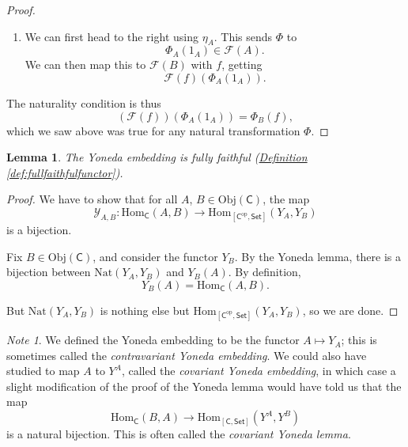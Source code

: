 \documentclass[a4paper]{report}
\newcommand{\Obj}{\mathrm{Obj}}
\newcommand{\Hom}{\mathrm{Hom}}
\newcommand{\Nat}{\mathrm{Nat}}
\theoremstyle{definition}
\theoremstyle{plain}
\newtheorem{lemma}{Lemma}[section]
\theoremstyle{remark}
\newtheorem{note}{Note}[section]
\begin{document}
\begin{proof}
\begin{enumerate}
    \item We can first head to the right using $\eta_{A}$. This sends $\Phi$ to 
      \begin{equation*}
        \Phi_{A}(1_{A}) \in \mathcal{F}(A).
      \end{equation*}
      We can then map this to $\mathcal{F}(B)$ with $f$, getting
      \begin{equation*}
        \mathcal{F}(f)(\Phi_{A}(1_{A})).
      \end{equation*}
  \end{enumerate}

  The naturality condition is thus
  \begin{equation*}
    (\mathcal{F}(f))(\Phi_{A}(1_{A})) = \Phi_{B}(f),
  \end{equation*}
  which we saw above was true for any natural transformation $\Phi$.
\end{proof}
\begin{lemma}
  The Yoneda embedding is fully faithful (\hyperref[def:fullfaithfulfunctor]{Definition \ref*{def:fullfaithfulfunctor}}).
\end{lemma}
\begin{proof}
  We have to show that for all $A$, $B \in \Obj(\mathsf{C})$, the map
  \begin{equation*}
    \mathcal{Y}_{A, B}\colon \Hom_{\mathsf{C}}(A, B) \to \Hom_{[\mathsf{C}^{\mathrm{op}}, \mathsf{Set}]}(Y_{A}, Y_{B})
  \end{equation*}
  is a bijection.

  Fix $B \in \Obj(\mathsf{C})$, and consider the functor $Y_{B}$. By the Yoneda lemma, there is a bijection between $\Nat(Y_{A}, Y_{B})$ and $Y_{B}(A)$. By definition,
  \begin{equation*}
    Y_{B}(A) = \Hom_{\mathsf{C}}(A, B).
  \end{equation*}

  But $\Nat(Y_{A}, Y_{B})$ is nothing else but $\Hom_{[\mathsf{C}^{\mathrm{op}}, \mathsf{Set}]}(Y_{A}, Y_{B})$, so we are done.
\end{proof}

\begin{note}
  We defined the Yoneda embedding to be the functor $A \mapsto Y_{A}$; this is sometimes called the \emph{contravariant Yoneda embedding}. We could also have studied to map $A$ to $Y^{A}$, called the \emph{covariant Yoneda embedding}, in which case a slight modification of the proof of the Yoneda lemma would have told us that the map
  \begin{equation*}
    \Hom_{\mathsf{C}}(B, A) \to \Hom_{[\mathsf{C}, \mathsf{Set}]}(Y^{A}, Y^{B})
  \end{equation*}
  is a natural bijection. This is often called the \emph{covariant Yoneda lemma}.
\end{note}
\end{document}
